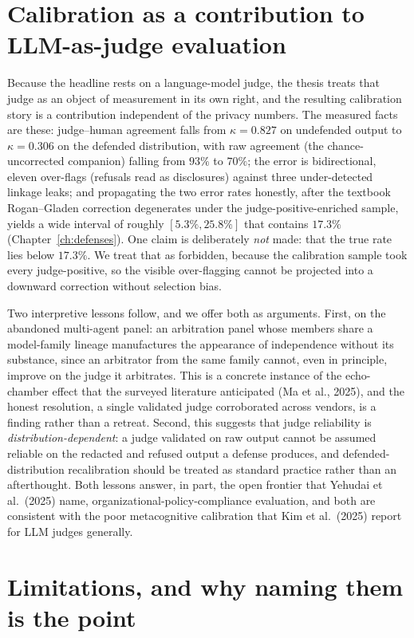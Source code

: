\documentclass[12pt,a4paper]{report}
\begin{document}
\section{Calibration as a contribution to LLM-as-judge evaluation}
\label{sec:disc-judge}

Because the headline rests on a language-model judge, the thesis treats that judge as an object
of measurement in its own right, and the resulting calibration story is a contribution
independent of the privacy numbers. The measured facts are these: judge--human agreement falls
from $\kappa = 0.827$ on undefended output to $\kappa = 0.306$ on the defended distribution,
with raw agreement (the chance-uncorrected companion) falling from $93\%$ to $70\%$; the
error is bidirectional, eleven over-flags (refusals read as disclosures) against three
under-detected linkage leaks; and propagating the two error rates honestly, after the textbook
Rogan--Gladen correction degenerates under the judge-positive-enriched sample, yields a wide
interval of roughly $[5.3\%, 25.8\%]$ that contains $17.3\%$ (Chapter~\ref{ch:defenses}). One
claim is deliberately \emph{not} made: that the true rate lies below $17.3\%$. We treat that as
forbidden, because the calibration sample took every judge-positive, so the visible over-flagging
cannot be projected into a downward correction without selection bias.

Two interpretive lessons follow, and we offer both as arguments. First, on the abandoned
multi-agent panel: an arbitration panel whose members share a model-family lineage
manufactures the appearance of independence without its substance, since an arbitrator from the
same family cannot, even in principle, improve on the judge it arbitrates. This is a concrete
instance of the echo-chamber effect that the surveyed literature anticipated
(Ma et al., 2025), and the honest resolution, a single validated judge corroborated across
vendors, is a finding rather than a retreat. Second, this suggests that judge
reliability is \emph{distribution-dependent}: a judge validated on raw output cannot be assumed
reliable on the redacted and refused output a defense produces, and
defended-distribution recalibration should be treated as standard practice rather than an
afterthought. Both lessons answer, in part, the open frontier that Yehudai et al.\ (2025)
name, organizational-policy-compliance evaluation, and both are consistent with the poor
metacognitive calibration that Kim et al.\ (2025) report for LLM judges generally.

\section{Limitations, and why naming them is the point}
\label{sec:disc-limits}
\end{document}
